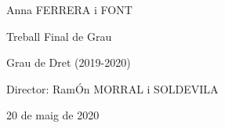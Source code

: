\documentclass[12pt]{article}
\begin{document}
\vspace{\baselineskip}

\vspace{\baselineskip}

\vspace{\baselineskip}

\vspace{\baselineskip}

\vspace{\baselineskip}

\vspace{\baselineskip}

\vspace{\baselineskip}

\vspace{\baselineskip}

\vspace{\baselineskip}

\vspace{\baselineskip}
\begin{Center}
Anna FERRERA i FONT
\end{Center}\par


\vspace{\baselineskip}
\begin{Center}
Treball Final de Grau 
\end{Center}\par


\vspace{\baselineskip}
\begin{Center}
Grau de Dret (2019-2020)
\end{Center}\par


\vspace{\baselineskip}
\begin{Center}
Director: RamÓn MORRAL i SOLDEVILA
\end{Center}\par


\vspace{\baselineskip}
\begin{Center}
20 de maig de 2020
\end{Center}\par


\vspace{\baselineskip}

\vspace{\baselineskip}

\vspace{\baselineskip}
\end{document}
